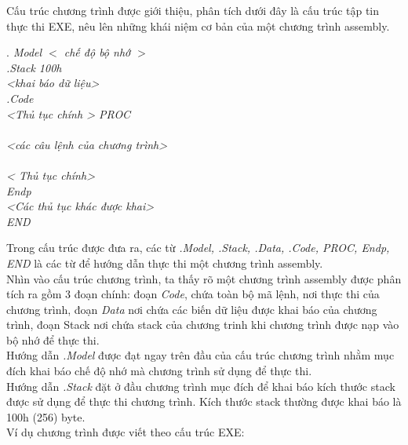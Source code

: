 Cấu trúc chương trình được giới thiệu, phân tích dưới đây là cấu trúc tập tin thực thi EXE, nêu lên những khái niệm cơ bản của một chương trình assembly. \\
	\begin{normalsize}
			\setlength{\parindent}{1cm}		
			\renewcommand{\rmdefault}{cmss}
			\textit {$.$ Model	$<$ chế độ bộ nhớ $>$	}		\\	
			\indent  \textit{.Stack 100h } \\			
			\indent \textit{<khai báo dữ liệu>} \\			
			\indent \textit{.Code}\\
			\indent \textit{<Thủ tục chính > PROC}\\ \\
			\indent \textit{<các câu lệnh của chương trình>}\\ \\
			\indent \textit{< Thủ tục chính> } \\
			\indent \textit{Endp}\\
			\indent \textit{<Các thủ tục khác được khai>}\\
			\indent \textit{END}\\
	\end{normalsize}
	
	Trong cấu trúc được đưa ra, các từ \textit {.Model, .Stack, .Data, .Code, PROC, Endp, END} là các từ để hướng dẫn thực thi một chương trình assembly. \\

Nhìn vào cấu trúc chương trình, ta thấy rõ một chương trình assembly được phân tích ra gồm 3 đoạn chính: đoạn \textit{Code}, chứa toàn bộ mã lệnh, nơi thực thi của chương trình, đoạn \textit{Data} nơi chứa các biến dữ liệu được khai báo của chương trình, đoạn Stack nơi chứa stack của chương trinh khi chương trình được nạp vào bộ nhớ để thực thi.\\

Hướng dẫn \textit{.Model} được đạt ngay trên đầu của cấu trúc chương trình nhằm mục đích khai báo chế độ nhớ mà chương trình sử dụng để thực thi.\\

Hướng dẫn \textit{.Stack} đặt ở đầu chương trình mục đích để khai báo kích thước stack được sử dụng để thực thi chương trình. Kích thước stack thường được khai báo là 100h (256) byte.\\

Ví dụ chương trình được viết theo cấu trúc EXE:\\

